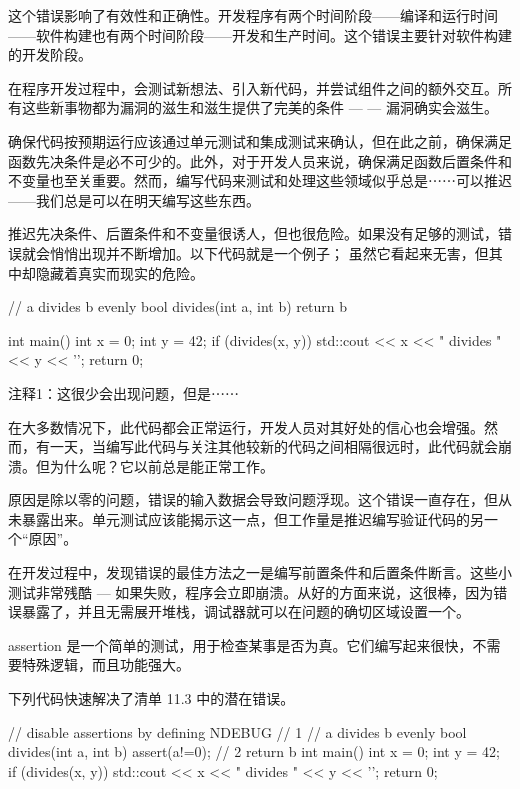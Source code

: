 这个错误影响了有效性和正确性。开发程序有两个时间阶段——编译和运行时间——软件构建也有两个时间阶段——开发和生产时间。这个错误主要针对软件构建的开发阶段。


在程序开发过程中，会测试新想法、引入新代码，并尝试组件之间的额外交互。所有这些新事物都为漏洞的滋生和滋生提供了完美的条件 — — 漏洞确实会滋生。

确保代码按预期运行应该通过单元测试和集成测试来确认，但在此之前，确保满足函数先决条件是必不可少的。此外，对于开发人员来说，确保满足函数后置条件和不变量也至关重要。然而，编写代码来测试和处理这些领域似乎总是⋯⋯可以推迟——我们总是可以在明天编写这些东西。

推迟先决条件、后置条件和不变量很诱人，但也很危险。如果没有足够的测试，错误就会悄悄出现并不断增加。以下代码就是一个例子； 虽然它看起来无害，但其中却隐藏着真实而现实的危险。


\begin{cpp}
// a divides b evenly
bool divides(int a, int b) {
  return b %
}

int main() {
  int x = 0;
  int y = 42;
  if (divides(x, y))
    std::cout << x << " divides " << y << '\n';
  return 0;
}
\end{cpp}

{\footnotesize
注释1：这很少会出现问题，但是⋯⋯
}

在大多数情况下，此代码都会正常运行，开发人员对其好处的信心也会增强。然而，有一天，当编写此代码与关注其他较新的代码之间相隔很远时，此代码就会崩溃。但为什么呢？它以前总是能正常工作。


原因是除以零的问题，错误的输入数据会导致问题浮现。这个错误一直存在，但从未暴露出来。单元测试应该能揭示这一点，但工作量是推迟编写验证代码的另一个“原因”。


在开发过程中，发现错误的最佳方法之一是编写前置条件和后置条件断言。这些小测试非常残酷 — 如果失败，程序会立即崩溃。从好的方面来说，这很棒，因为错误暴露了，并且无需展开堆栈，调试器就可以在问题的确切区域设置一个。

assertion 是一个简单的测试，用于检查某事是否为真。它们编写起来很快，不需要特殊逻辑，而且功能强大。

下列代码快速解决了清单 11.3 中的潜在错误。


\begin{cpp}
// disable assertions by defining NDEBUG // 1
// a divides b evenly
bool divides(int a, int b) {
  assert(a!=0); // 2
  return b %
}
int main() {
  int x = 0;
  int y = 42;
  if (divides(x, y))
    std::cout << x << " divides " << y << '\n';
  return 0;
}
\end{cpp}

